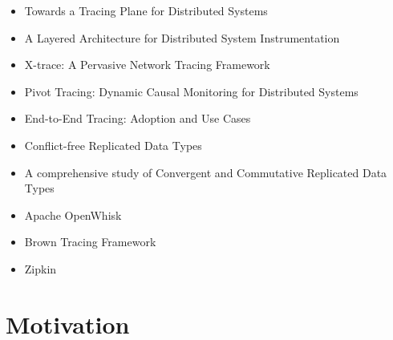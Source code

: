 \begin{itemize}
  \item Towards a Tracing Plane for Distributed Systems\cite{Fonseca16}
  \item A Layered Architecture for Distributed System Instrumentation\cite{Mace17}
  \item X-trace: A Pervasive Network Tracing Framework\cite{Fonseca:2007:XPN:1973430.1973450}
  \item Pivot Tracing: Dynamic Causal Monitoring for Distributed Systems\cite{Mace:2015:PTD:2815400.2815415}
  \item End-to-End Tracing: Adoption and Use Cases\cite{mace2017survey}
  \item Conflict-free Replicated Data Types\cite{Shapiro:2011:CRD:2050613.2050642}
  \item A comprehensive study of Convergent and Commutative Replicated Data Types\cite{shapiro:inria-00555588}
  \item Apache OpenWhisk\cite{web:wsk}
  \item Brown Tracing Framework\cite{web:btf}
  \item Zipkin
\end{itemize}

\section{Motivation}
